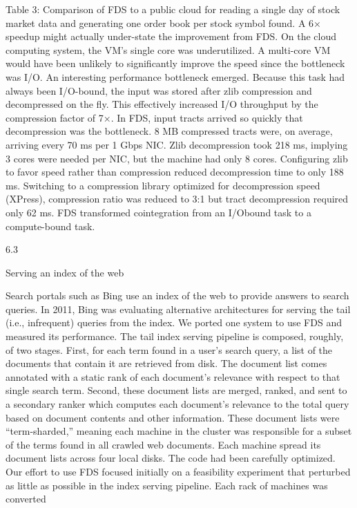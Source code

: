 Table 3: Comparison of FDS to a public cloud for reading a single day of stock market data and generating one
order book per stock symbol found.
A 6× speedup might actually under-state the improvement from FDS. On the cloud computing system, the
VM’s single core was underutilized. A multi-core VM
would have been unlikely to significantly improve the
speed since the bottleneck was I/O.
An interesting performance bottleneck emerged. Because this task had always been I/O-bound, the input
was stored after zlib compression and decompressed on
the fly. This effectively increased I/O throughput by
the compression factor of 7×. In FDS, input tracts arrived so quickly that decompression was the bottleneck.
8 MB compressed tracts were, on average, arriving every
70 ms per 1 Gbps NIC. Zlib decompression took 218 ms,
implying 3 cores were needed per NIC, but the machine had only 8 cores. Configuring zlib to favor speed
rather than compression reduced decompression time to
only 188 ms. Switching to a compression library optimized for decompression speed (XPress), compression
ratio was reduced to 3:1 but tract decompression required
only 62 ms. FDS transformed cointegration from an I/Obound task to a compute-bound task.

6.3

Serving an index of the web

Search portals such as Bing use an index of the web to
provide answers to search queries. In 2011, Bing was
evaluating alternative architectures for serving the tail
(i.e., infrequent) queries from the index. We ported one
system to use FDS and measured its performance.
The tail index serving pipeline is composed, roughly,
of two stages. First, for each term found in a user’s
search query, a list of the documents that contain it are
retrieved from disk. The document list comes annotated
with a static rank of each document’s relevance with respect to that single search term. Second, these document
lists are merged, ranked, and sent to a secondary ranker
which computes each document’s relevance to the total
query based on document contents and other information. These document lists were “term-sharded,” meaning each machine in the cluster was responsible for a
subset of the terms found in all crawled web documents.
Each machine spread its document lists across four local
disks. The code had been carefully optimized.
Our effort to use FDS focused initially on a feasibility
experiment that perturbed as little as possible in the index
serving pipeline. Each rack of machines was converted

